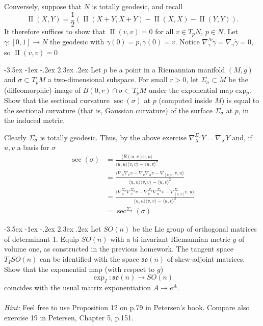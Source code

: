 \documentclass[10pt]{article}
\makeatletter
\renewcommand\section{\@startsection{section}{1}{\z@}%
                                  {-3.5ex \@plus -1ex \@minus -.2ex}%
                                  {2.3ex \@plus.2ex}%
                                  {\normalfont\large\bfseries}}
\DeclareMathOperator{\2}{II}
\newcommand{\hint}[1]{{\emph{Hint:} #1}} %
\makeatother
\begin{document}
Conversely, suppose that $N$ is totally geodesic, and recall
\[ \2(X,Y) = \frac{1}{2} \left( \2(X+Y, X+Y) - \2(X,X) -\2(Y,Y) \right).\]
It therefore suffices to show that $\2(v,v) =0 $ for all $v \in T_p N$, $p \in N$. Let $\gamma : [0,1] \to N$ the geodesic with $\gamma(0) = p, \dot{\gamma}(0) = v$. Notice $\nabla_{\dot{\gamma}}^N \dot{\gamma} = \nabla_{\dot{\gamma}}  \dot{\gamma} = 0$, so $\2(v,v) =0$


\section{Let $p$ be a point in a Riemannian manifold $(M, g)$ and $\sigma \subset T_p M$ a two-dimensional subspace. For small $r > 0$, let $\Sigma_\sigma \subset M$ be the (diffeomorphic) image of $B(0,r) \cap \sigma \subset T_pM$ under the exponential map exp$_p$. Show that the sectional curvature $\sec(\sigma)$ at $p$ (computed inside $M$) is equal to the sectional curvature (that is, Gaussian curvature) of the surface $\Sigma_\sigma$ at $p$, in the induced metric.}

Clearly $\Sigma_\sigma$ is totally geodesic. Thus, by the above exercise $\nabla_X^{\Sigma_\sigma} Y = \nabla_X Y$ and, if $u,v$ a basis for $\sigma$
\begin{align*}
	\sec(\sigma) &= \frac{ \langle R(u,v) v, u \rangle}{\langle u,u \rangle \langle v,v \rangle - \langle u, v \rangle^2}\\
	&= \frac{ \langle \nabla_u \nabla_v v - \nabla_v \nabla_u v - \nabla_{[u,v]} v , u \rangle}{\langle u,u \rangle \langle v,v \rangle - \langle u, v \rangle^2}\\ 
	&= \frac{ \langle \nabla^{\Sigma_\sigma}_u \nabla^{\Sigma_\sigma}_v v - \nabla^{\Sigma_\sigma}_v \nabla^{\Sigma_\sigma}_u v - \nabla^{\Sigma_\sigma}_{[u,v]} v , u \rangle}{\langle u,u \rangle \langle v,v \rangle - \langle u, v \rangle^2}\\ 
	&= \sec^{\Sigma_\sigma}(\sigma)
\end{align*}

\section{Let $SO(n)$ be the Lie group of orthogonal matrices of determinant 1. Equip $SO(n)$ with a bi-invariant Riemannian metric $g$ of volume one, as constructed in the previous homework. The tangent space $T_I SO(n)$ can be identified with the space $\mathfrak{so}(n)$ of skew-adjoint matrices. Show that the exponential map (with respect to $g$) $$\exp_I : \mathfrak{so}(n) \to SO(n)$$ coincides with the usual matrix exponentiation $A \to e^A$. \\\\ \hint{Feel free to use Proposition 12 on p.79 in Petersen's book. Compare also exercise 19 in Petersen, Chapter 5, p.151.}}
\end{document}
